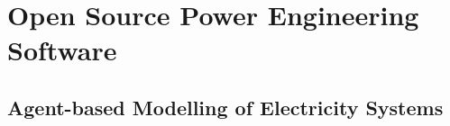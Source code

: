 

\section{Open Source Power Engineering Software}
\subsection{Agent-based Modelling of Electricity Systems}
\label{sec:ames}
